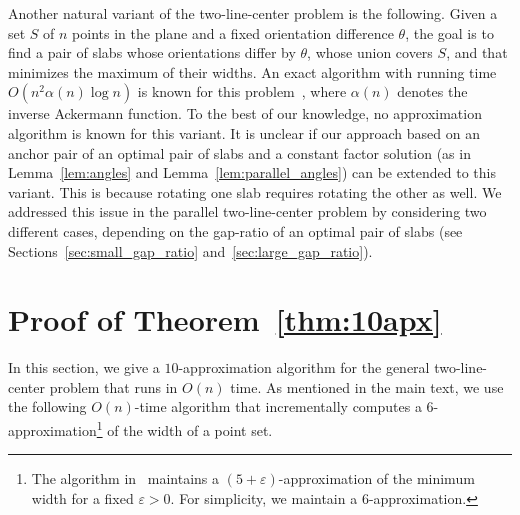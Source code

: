 \documentclass[10pt,a4paper]{article}
\theoremstyle{star}
\theoremstyle{claimstar}
\newcommand{\eps}{\ensuremath{\varepsilon}}
\begin{document}
Another natural variant of the two-line-center problem is the following. Given a set $S$ of $n$ points in the plane and a fixed orientation difference $\theta$, the goal is to find a pair of slabs whose orientations differ by $\theta$, whose union covers $S$, and that minimizes the maximum of their widths. 
An exact algorithm with running time $O(n^2 \alpha(n)\log n)$ is known for this problem~\cite{ahn2024constrained}, where $\alpha(n)$ denotes the inverse Ackermann function. 
To the best of our knowledge, no approximation algorithm is known for this variant.
It is unclear if our approach based on an anchor pair of an optimal pair of slabs and a constant factor solution (as in Lemma~\ref{lem:angles} and Lemma~\ref{lem:parallel_angles}) can be extended to this variant.
This is because rotating one slab requires rotating the other as well. We addressed this issue in the parallel two-line-center problem by considering two different cases, depending on the gap-ratio of an optimal pair of slabs (see Sections~\ref{sec:small_gap_ratio} and~\ref{sec:large_gap_ratio}).

















\appendix



\section{Proof of Theorem~\ref{thm:10apx}}
\label{sec:linear_10apx}

In this section, we give a $10$-approximation algorithm for the general two-line-center problem that runs in $O(n)$ time. 
As mentioned in the main text, we use the following $O(n)$-time algorithm that incrementally computes a $6$-approximation\footnote{The algorithm in~\cite{chan2006faster} maintains a $(5+\eps)$-approximation of the minimum width for a fixed $\eps>0$. For simplicity, we maintain a $6$-approximation.} of the width of a point set.
\end{document}
